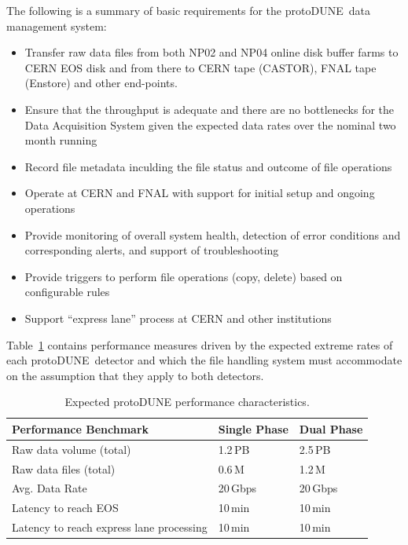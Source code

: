 \documentclass[pdftex,12pt,letter]{article}
\newcommand{\pd}{protoDUNE\ }
\begin{document}
The following is a summary of basic requirements for the \pd data management system:
\begin{itemize}

\item Transfer raw data files from both NP02 and NP04 online disk buffer farms
to CERN EOS disk and from there to CERN tape (CASTOR), FNAL tape (Enstore) and other end-points.

\item Ensure that the throughput is adequate and there are no bottlenecks for the Data Acquisition System
given the expected data rates over the nominal two month running%

\item Record file metadata inculding the file status and outcome of file operations

\item Operate at CERN and FNAL with support for initial setup and ongoing operations

\item Provide monitoring of overall system health, detection of error conditions and corresponding alerts, and support of troubleshooting

\item Provide triggers to perform file operations (copy, delete) based on configurable rules

\item Support ``express lane'' process at CERN and other institutions

\end{itemize}

\noindent
Table~\ref{fig:det_perf} contains performance measures driven by the expected extreme rates of each \pd detector
and which the file handling system must accommodate on the assumption that they apply to both detectors.


\begin{table}[tbh]
\centering
\begin{tabular}{l l l}
\hline
\textbf{Performance Benchmark} & \textbf{Single Phase} & \textbf{Dual Phase}\\
\hline
\hline
Raw data volume (total)                    & 1.2\,PB & 2.5\,PB \\
Raw data files (total)                      & 0.6\,M  & 1.2\,M\\
Avg. Data Rate                                & 20\,Gbps & 20\,Gbps \\
Latency to reach EOS                     & 10\,min & 10\,min\\
Latency to reach express lane processing & 10\,min & 10\,min\\
\hline
\end{tabular}
\caption{\label{fig:det_perf}Expected protoDUNE performance characteristics.}
\end{table}
\end{document}
